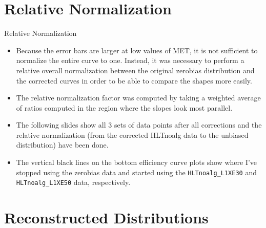 \documentclass[]{beamer}
\begin{document}
\section{Relative Normalization}
\begin{frame}{Relative Normalization}
		\begin{itemize}
				\item Because the error bars are larger at low values of MET, it is not sufficient to normalize the entire curve to one. Instead, it was necessary to perform a relative overall normalization between the original zerobias distribution and the corrected curves in order to be able to compare the shapes more easily.
				\item The relative normalization factor was computed by taking a weighted average of ratios computed in the region where the slopes look most parallel.
                \item The following slides show all 3 sets of data points after all corrections and the relative normalization (from the corrected HLTnoalg data to the unbiased distribution) have been done.
                \item The vertical black lines on the bottom efficiency curve plots show where I've stopped using the zerobias data and started using the \texttt{HLTnoalg\_L1XE30} and \texttt{HLTnoalg\_L1XE50} data, respectively.
		\end{itemize}
\end{frame}
\section{Reconstructed Distributions}
\begin{frame}
\end{frame}
\end{document}
